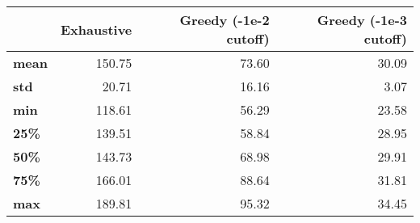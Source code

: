 \begin{tabular}{lrrr}
\toprule
{} &  Exhaustive &  Greedy (-1e-2 cutoff) &  Greedy (-1e-3 cutoff) \\
\midrule
\textbf{mean} &      150.75 &                  73.60 &                  30.09 \\
\textbf{std } &       20.71 &                  16.16 &                   3.07 \\
\textbf{min } &      118.61 &                  56.29 &                  23.58 \\
\textbf{25\% } &      139.51 &                  58.84 &                  28.95 \\
\textbf{50\% } &      143.73 &                  68.98 &                  29.91 \\
\textbf{75\% } &      166.01 &                  88.64 &                  31.81 \\
\textbf{max } &      189.81 &                  95.32 &                  34.45 \\
\bottomrule
\end{tabular}
